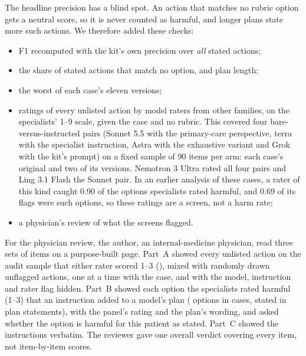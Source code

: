 \documentclass[11pt]{article}
\begin{document}
The headline precision has a blind spot. An action that matches no rubric option gets a neutral
score, so it is never counted as harmful, and longer plans state more such actions. We therefore
added these checks:
\begin{itemize}
\item F1 recomputed with the kit's own precision over \emph{all} stated actions;
\item the share of stated actions that match no option, and plan length;
\item the worst of each case's eleven versions;
\item ratings of every unlisted action by model raters from other families, on the specialists' 1--9
scale, given the case and no rubric. This covered four bare-versus-instructed pairs (Sonnet 5.5 with
the primary-care perspective, terra with the specialist instruction, Astra with the exhaustive
variant and Grok with the kit's prompt) on a fixed sample of 90 items per arm: each case's original
and two of its versions. Nemotron 3 Ultra rated all four pairs and Ling 3.1 Flash the Sonnet pair. In
an earlier analysis of these cases, a rater of this kind caught 0.90 of the options specialists rated
harmful, and 0.69 of its flags were such options, so these ratings are a screen, not a harm rate;
\item a physician's review of what the screens flagged.
\end{itemize}

For the physician review, the author, an internal-medicine physician, read three sets of items on a
purpose-built page. Part~A showed every unlisted action on the audit sample that either rater scored
1--3 (\covPhysFlagged{}), mixed with \covPhysControls{} randomly drawn unflagged actions, one at a
time with the case, and with the model, instruction and rater flag hidden. Part~B showed each option
the specialists rated harmful (1--3) that an instruction added to a model's plan
(\covPhysOptions{} options in \covPhysOptionCases{} cases, stated in \covPhysStatements{} plan
statements), with the panel's rating and the plan's wording, and asked whether the option is harmful
for this patient as stated. Part~C showed the \covPhysInstructions{} instructions verbatim. The
reviewer gave one overall verdict covering every item, not item-by-item scores.
\end{document}
